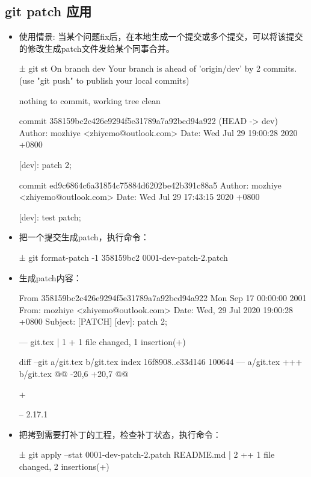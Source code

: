 \subsection{git patch 应用}
\begin{itemize}
\item 使用情景: 当某个问题fix后，在本地生成一个提交或多个提交，可以将该提交的修改生成patch文件发给某个同事合并。
\begin{messagebox}
± git st
On branch dev
Your branch is ahead of 'origin/dev' by 2 commits.
  (use "git push" to publish your local commits)

nothing to commit, working tree clean
\end{messagebox}

\begin{messagebox}
commit 358159bc2c426e9294f5e31789a7a92bcd94a922 (HEAD -> dev)
Author: mozhiye <zhiyemo@outlook.com>
Date:   Wed Jul 29 19:00:28 2020 +0800

    [dev]: patch 2;

commit ed9c6864c6a31854c75884d6202be42b391c88a5
Author: mozhiye <zhiyemo@outlook.com>
Date:   Wed Jul 29 17:43:15 2020 +0800

    [dev]: test patch;

\end{messagebox}

\item 把一个提交生成patch，执行命令：
\begin{commandbox}
± git format-patch -1 358159bc2
0001-dev-patch-2.patch
\end{commandbox}

\item 生成patch内容：
\begin{messagebox}
From 358159bc2c426e9294f5e31789a7a92bcd94a922 Mon Sep 17 00:00:00 2001
From: mozhiye <zhiyemo@outlook.com>
Date: Wed, 29 Jul 2020 19:00:28 +0800
Subject: [PATCH] [dev]: patch 2;

---
 git.tex | 1 +
 1 file changed, 1 insertion(+)

diff --git a/git.tex b/git.tex
index 16f8908..e33d146 100644
--- a/git.tex
+++ b/git.tex
@@ -20,6 +20,7 @@
 \graphicspath{{figure/}}
 \usepackage{newenviron}

+
 

-- 
2.17.1
\end{messagebox}

\item 把拷到需要打补丁的工程，检查补丁状态，执行命令：
\begin{commandbox}
± git apply --stat 0001-dev-patch-2.patch 
 README.md |    2 ++
 1 file changed, 2 insertions(+)
\end{commandbox}


\end{itemize}
